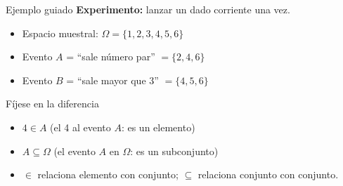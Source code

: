 \documentclass[aspectratio=169,10pt]{beamer}
\begin{document}
\begin{frame}{Ejemplo guiado}
  \textbf{Experimento:} lanzar un dado corriente una vez.

  \vspace{0.3cm}
  \begin{itemize}
    \item Espacio muestral: $\Omega=\{1,2,3,4,5,6\}$
    \item Evento $A$ = ``sale número par'' $=\{2,4,6\}$
    \item Evento $B$ = ``sale mayor que 3'' $=\{4,5,6\}$
  \end{itemize}

  \vspace{0.35cm}
  \begin{exampleblock}{Fíjese en la diferencia}
    \begin{itemize}
      \item $4 \in A$ \quad (el 4  al evento $A$: es un elemento)
      \item $A \subseteq \Omega$ \quad (el evento $A$  en
            $\Omega$: es un subconjunto)
      \item $\in$ relaciona elemento con conjunto; $\subseteq$ relaciona
            conjunto con conjunto.
    \end{itemize}
  \end{exampleblock}
\end{frame}
\end{document}
